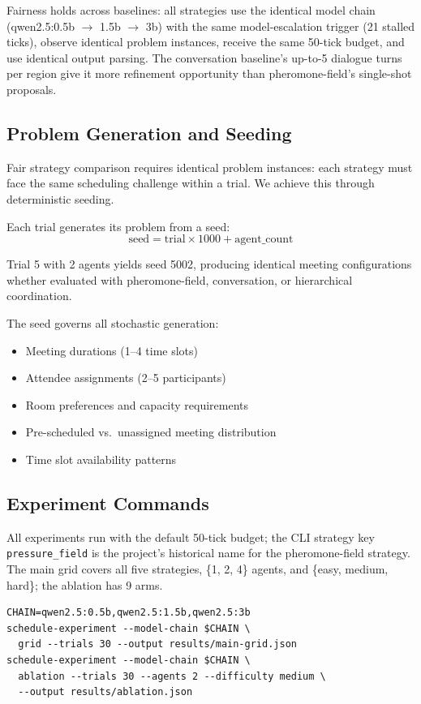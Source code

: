 Fairness holds across baselines: all strategies use the identical model chain (qwen2.5:0.5b $\to$ 1.5b $\to$ 3b) with the same model-escalation trigger (21 stalled ticks), observe identical problem instances, receive the same 50-tick budget, and use identical output parsing. The conversation baseline's up-to-5 dialogue turns per region give it more refinement opportunity than pheromone-field's single-shot proposals.

\subsection{Problem Generation and Seeding}

Fair strategy comparison requires identical problem instances: each strategy must face the same scheduling challenge within a trial. We achieve this through deterministic seeding.

Each trial generates its problem from a seed:
\[
\text{seed} = \text{trial} \times 1000 + \text{agent\_count}
\]

Trial 5 with 2 agents yields seed 5002, producing identical meeting configurations whether evaluated with pheromone-field, conversation, or hierarchical coordination.

The seed governs all stochastic generation:
\begin{itemize}
\item Meeting durations (1--4 time slots)
\item Attendee assignments (2--5 participants)
\item Room preferences and capacity requirements
\item Pre-scheduled vs.\ unassigned meeting distribution
\item Time slot availability patterns
\end{itemize}

\subsection{Experiment Commands}

All experiments run with the default 50-tick budget; the CLI strategy key \texttt{pressure\_field} is the project's historical name for the pheromone-field strategy. The main grid covers all five strategies, \{1, 2, 4\} agents, and \{easy, medium, hard\}; the ablation has 9 arms.
\begin{lstlisting}
CHAIN=qwen2.5:0.5b,qwen2.5:1.5b,qwen2.5:3b
schedule-experiment --model-chain $CHAIN \
  grid --trials 30 --output results/main-grid.json
schedule-experiment --model-chain $CHAIN \
  ablation --trials 30 --agents 2 --difficulty medium \
  --output results/ablation.json
\end{lstlisting}

